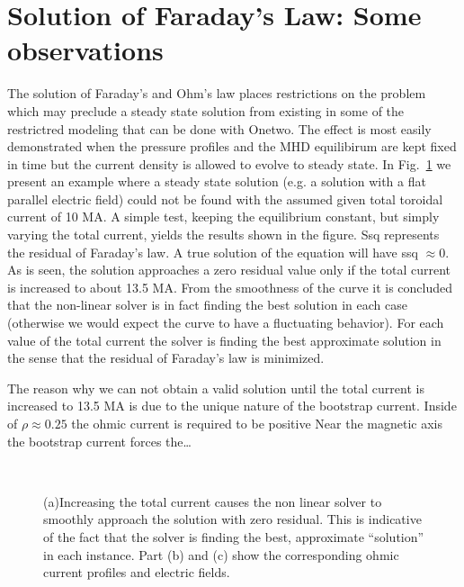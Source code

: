 \renewcommand{\textfraction}{0.10}
\renewcommand{\topfraction}{0.90}  %
\renewcommand{\bottomfraction}{0.65} %
\renewcommand{\floatpagefraction}{0.60}

\section{Solution of Faraday's Law: Some observations}

The solution of Faraday's and Ohm's law places restrictions on the problem which
may preclude a steady state solution from existing in some of the restrictred
modeling that can be done with Onetwo.  The effect is most easily demonstrated
when the pressure profiles and the MHD equilibirum are kept fixed in time but
the current density is allowed to evolve to steady state. In Fig.~\ref{F1a} we
present an example where a steady state solution (e.g. a solution with a flat
parallel electric field)  could not be found  with the assumed  given total
toroidal current of 10 MA. A simple test, keeping the equilibrium constant, but
simply varying the total current, yields  the results shown in the figure.  Ssq
represents the residual of Faraday's  law. A true solution of the equation will
have ssq $ \approx 0 $. As is seen, the solution approaches a zero residual
value only if the total current is increased to about 13.5 MA. From the
smoothness of the curve it is concluded that the non-linear solver is in fact
finding the best solution in each case (otherwise we would expect the curve to
have a fluctuating behavior). For each value of the total current the solver is
finding the best approximate solution in the sense that the residual of
Faraday's law is minimized.

The reason why we can not obtain a valid solution until the total current is
increased to 13.5 MA is due to the unique nature of the bootstrap current.
Inside of $ \rho \approx 0.25 $ the ohmic current is required to be positive 
Near the magnetic axis the bootstrap current forces the\ldots 

\begin{figure}[hbt] %
 \centering  
 \centering   
 \mbox{} \\
 \vspace{.5in}
 \begin{narrow}{-.50in}{0in}
 \mbox{}
 \mbox{}
 \end{narrow}
 \caption{(a)Increasing the total current causes the non linear solver to
 smoothly approach the solution with zero residual. This is indicative of the
 fact that the solver is finding the best, approximate ``solution'' in each
 instance. Part (b) and (c) show the corresponding ohmic current profiles and
 electric fields.}
 \label{F1a}
\end{figure}

